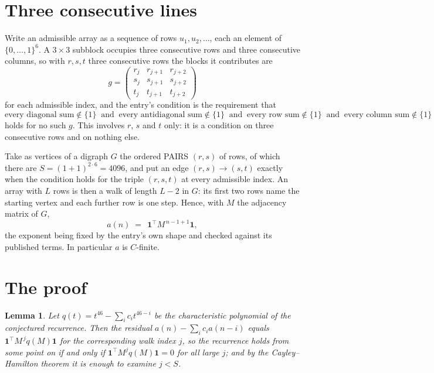 \documentclass[11pt,a4paper]{article}
\theoremstyle{plain}
\newtheorem{lemma}[theorem]{Lemma}
\theoremstyle{definition}
\begin{document}
\section{Three consecutive lines}

Write an admissible array as a sequence of rows $u_1,u_2,\dots$, each an element of
$\{0,\dots,1\}^{6}$. A $3\times3$ subblock occupies three consecutive rows and
three consecutive columns, so with $r,s,t$ three consecutive rows the blocks it
contributes are
\[
g=\begin{pmatrix}r_j&r_{j+1}&r_{j+2}\\ s_j&s_{j+1}&s_{j+2}\\ t_j&t_{j+1}&t_{j+2}\end{pmatrix}
\]
for each admissible index, and the entry's condition is the requirement that
\[
\text{every diagonal sum} \notin \{1\}\ \text{ and }\ \text{every antidiagonal sum} \notin \{1\}\ \text{ and }\ \text{every row sum} \notin \{1\}\ \text{ and }\ \text{every column sum} \notin \{1\}
\]
holds for no such $g$. This involves $r$, $s$ and $t$ only: it is a condition on
three consecutive rows and on nothing else.

Take as vertices of a digraph $G$ the ordered PAIRS $(r,s)$ of rows, of which there are
$S=(1+1)^{2\cdot6}=4096$, and put an edge $(r,s)\to(s,t)$ exactly when the condition
holds for the triple $(r,s,t)$ at every admissible index. An array with $L$ rows is then a
walk of length $L-2$ in $G$: its first two rows name the starting vertex and each further
row is one step. Hence, with $M$ the adjacency matrix of $G$,
\[
a(n)\;=\;\,\mathbf{1}^{\!\top}M^{\,n-1+1}\mathbf{1},
\]
the exponent being fixed by the entry's own shape and checked against its published terms.
In particular $a$ is $C$-finite.

\section{The proof}

\begin{lemma}\label{lem:crit}
Let $q(t)=t^{46}-\sum_i c_it^{46-i}$ be the characteristic polynomial of the
conjectured recurrence. Then the residual $a(n)-\sum_ic_ia(n-i)$ equals
$\mathbf{1}^{\!\top}M^{\,j}q(M)\mathbf{1}$ for the corresponding walk index
$j$, so the recurrence holds from some point on if and only if
$\mathbf{1}^{\!\top}M^{j}q(M)\mathbf{1}=0$ for all large $j$; and by the
Cayley--Hamilton theorem it is enough to examine $j<S$.
\end{lemma}
\end{document}

